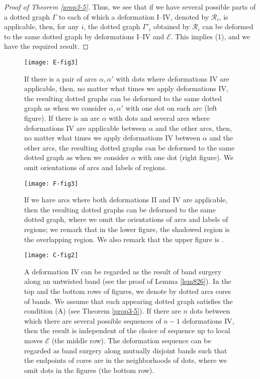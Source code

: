 \documentclass[a4paper,11pt]{amsart}
\numberwithin{equation}{section}
\begin{document}
\begin{proof}[
Proof of Theorem \ref{prop3-5}]
Thus, we see that if we have several possible parts of a dotted graph $\Gamma$ to each of which a deformation I--IV, denoted by $\mathcal{R}_i$, is applicable, then, for any $i$, the dotted graph $\Gamma'_i$ obtained by $\mathcal{R}_i$ can be deformed to the same dotted graph by deformations I--IV and $\mathcal{E}$. 
This implies (1), and we have the required result. 
\end{proof}

\begin{figure}[ht]
\centering
\texttt{[image: E-fig3]}
\caption{If there is a pair of arcs $\alpha, \alpha'$ with dots where deformations IV are applicable, 
then, no matter what times we apply deformations IV, the resulting dotted graphs can be deformed to the same dotted graph as when we consider $\alpha, \alpha'$ with one dot on each arc (left figure). If there is an arc $\alpha$ with dots and several arcs where deformations IV are applicable between $\alpha$ and the other arcs, 
then, no matter what times we apply deformations IV between $\alpha$ and the other arcs, the resulting dotted graphs can be deformed to the same dotted graph as when we consider $\alpha$ with one dot (right figure). We omit orientations of arcs and labels of regions.} %
\label{B-fig11}
\end{figure}

\begin{figure}[ht]
\centering
\texttt{[image: F-fig3]}
\caption{If we have arcs where both deformations II and IV are applicable, then the resulting dotted graphs can be deformed to the same dotted graph, where we omit the orientations of arcs and labels of regions; we remark that in the lower figure, the shadowed region is the overlapping region. We also remark that the upper figure is \cite[Figure 6.4]{N}.}%
\label{B-fig12}
\end{figure}

 

\begin{figure}[ht]
\centering
\texttt{[image: C-fig2]}
\caption{A deformation IV can be regarded as the result of band surgery along an untwisted band (see the proof of Lemma \ref{lem826}). In the top and the bottom rows of figures, we denote by dotted arcs cores of bands. We assume that each appearing dotted graph satisfies the condition (A) (see Theorem \ref{prop3-5}). 
If there are $n$ dots between which there are several possible sequences of $n-1$ deformations IV, then the result is independent of the choice of sequence up to local moves $\mathcal{E}$ (the middle row). The deformation sequence can be regarded as band surgery along mutually disjoint bands such that the endpoints of cores are in the neighborhoods of dots, where we omit dots in the figures (the bottom row). }%
\label{C-fig2}
\end{figure}
\end{document}
